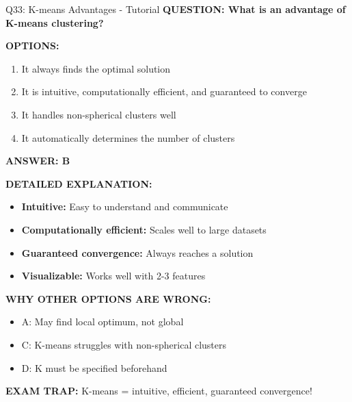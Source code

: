 \documentclass[8pt]{beamer}
\begin{document}
	\begin{frame}{Q33: K-means Advantages - Tutorial}
		\fontsize{6.5}{7.5}\selectfont
		\textbf{QUESTION: What is an advantage of K-means clustering?}
		
		\vspace{0.1cm}
		\textbf{OPTIONS:}
		\begin{enumerate}
			\item It always finds the optimal solution
			\item It is intuitive, computationally efficient, and guaranteed to converge
			\item It handles non-spherical clusters well
			\item It automatically determines the number of clusters
		\end{enumerate}
		
		\vspace{0.1cm}
		\textcolor{myblue}{\textbf{ANSWER: B}}
		
		\vspace{0.1cm}
		\textbf{DETAILED EXPLANATION:}
		\begin{itemize}
			\item \textbf{Intuitive:} Easy to understand and communicate
			\item \textbf{Computationally efficient:} Scales well to large datasets
			\item \textbf{Guaranteed convergence:} Always reaches a solution
			\item \textbf{Visualizable:} Works well with 2-3 features
		\end{itemize}
		
		\vspace{0.1cm}
		\textcolor{myred}{\textbf{WHY OTHER OPTIONS ARE WRONG:}}
		\begin{itemize}
			\item \textcolor{myred}{A:} May find local optimum, not global
			\item \textcolor{myred}{C:} K-means struggles with non-spherical clusters
			\item \textcolor{myred}{D:} K must be specified beforehand
		\end{itemize}
		
		\textcolor{myred}{\textbf{EXAM TRAP:}} K-means = \textcolor{myblue}{intuitive, efficient, guaranteed convergence}!
	\end{frame}
	
\end{document}
